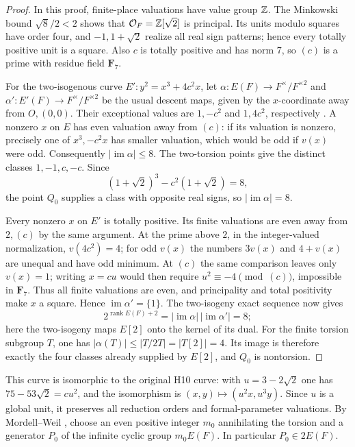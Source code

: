 \documentclass[11pt]{article}
\theoremstyle{definition}\newtheorem{inputthm}[theorem]{Hypothesis}
\theoremstyle{remark}\newtheorem{remark}[theorem]{Remark}
\begin{document}
\begin{proof}
In this proof, finite-place valuations have value group $\mathbb Z$.
The Minkowski bound $\sqrt8/2<2$ shows that
$\mathcal O_F=\mathbb Z[\sqrt2]$ is principal. Its units modulo squares
have order four, and $-1,1+\sqrt2$ realize all real sign patterns;
hence every totally positive unit is a square. Also $c$ is totally
positive and has norm $7$, so $(c)$ is a prime with residue field
$\mathbf F_7$.

For the two-isogenous curve $E':y^2=x^3+4c^2x$, let
$\alpha:E(F)\to F^\times/F^{\times2}$ and
$\alpha':E'(F)\to F^\times/F^{\times2}$ be the usual descent maps,
given by the $x$-coordinate away from $O,(0,0)$. Their exceptional
values are $1,-c^2$ and $1,4c^2$, respectively
\cite[Example~X.4.8 and Proposition~X.4.9]{Silverman}.
A nonzero $x$ on $E$ has even valuation away from $(c)$:
if its valuation is nonzero, precisely one of $x^3,-c^2x$
has smaller valuation, which would be odd if $v(x)$ were odd.
Consequently $|\operatorname{im}\alpha|\le8$.
The two-torsion points give the distinct classes $1,-1,c,-c$.
Since
\[
 (1+\sqrt2)^3-c^2(1+\sqrt2)=8,
\]
the point $Q_0$ supplies a class with opposite real signs, so
$|\operatorname{im}\alpha|=8$.

Every nonzero $x$ on $E'$ is totally positive. Its finite valuations
are even away from $2,(c)$ by the same argument. At the prime above
$2$, in the integer-valued normalization, $v(4c^2)=4$; for odd
$v(x)$ the numbers $3v(x)$ and $4+v(x)$ are unequal and have odd
minimum. At $(c)$ the same comparison leaves only $v(x)=1$;
writing $x=cu$ would then require $u^2\equiv-4\pmod{(c)}$,
impossible in $\mathbf F_7$. Thus all finite valuations are even,
and principality and total positivity make $x$ a square. Hence
$\operatorname{im}\alpha'=\{1\}$.
The two-isogeny exact sequence
\cite[Remark~X.4.7]{Silverman} now gives
\[
 2^{\operatorname{rank}E(F)+2}
 =|\operatorname{im}\alpha|\,|\operatorname{im}\alpha'|=8;
\]
here the two-isogeny maps $E[2]$ onto the kernel of its dual.
For the finite torsion subgroup $T$, one has
$|\alpha(T)|\le|T/2T|=|T[2]|=4$. Its image is therefore exactly
the four classes already supplied by $E[2]$, and $Q_0$ is nontorsion.
\end{proof}

This curve is isomorphic to the original H10 curve: with
$u=3-2\sqrt2$ one has $75-53\sqrt2=cu^2$, and the isomorphism is
$(x,y)\mapsto(u^2x,u^3y)$. Since $u$ is a global unit, it preserves
all reduction orders and formal-parameter valuations.
By Mordell--Weil \cite[Theorem~VIII.6.7]{Silverman}, choose an even
positive integer $m_0$ annihilating the torsion and a generator
$P_0$ of the infinite cyclic group $m_0E(F)$. In particular $P_0\in2E(F)$.
\end{document}
